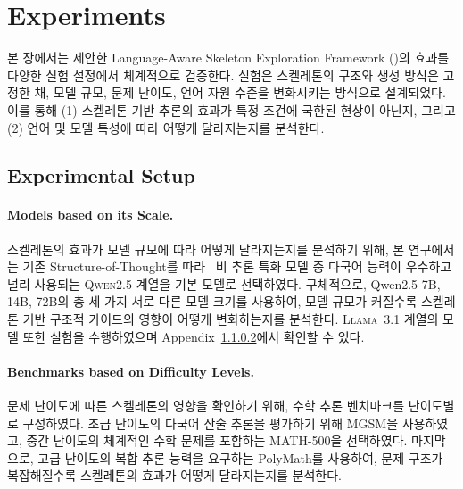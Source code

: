 \section{Experiments}

본 장에서는 제안한 Language-Aware Skeleton Exploration Framework (\LASEF)의 효과를 다양한 실험 설정에서 체계적으로 검증한다. 실험은 스켈레톤의 구조와 생성 방식은 고정한 채, 모델 규모, 문제 난이도, 언어 자원 수준을 변화시키는 방식으로 설계되었다. 이를 통해 (1) 스켈레톤 기반 추론의 효과가 특정 조건에 국한된 현상이 아닌지, 그리고 (2) 언어 및 모델 특성에 따라 어떻게 달라지는지를 분석한다. %

\subsection{Experimental Setup}

\paragraph{Models based on its Scale.}
스켈레톤의 효과가 모델 규모에 따라 어떻게 달라지는지를 분석하기 위해, 본 연구에서는 기존 Structure-of-Thought를 따라~\citep{qi2025sot} 비 추론 특화 모델 중 다국어 능력이 우수하고 널리 사용되는 \textsc{Qwen2.5} 계열을 기본 모델로 선택하였다. 구체적으로, Qwen2.5-7B, 14B, 72B의 총 세 가지 서로 다른 모델 크기를 사용하여, 모델 규모가 커질수록 스켈레톤 기반 구조적 가이드의 영향이 어떻게 변화하는지를 분석한다. \textsc{Llama~3.1} 계열의 모델 또한 실험을 수행하였으며 Appendix~\ref{}에서 확인할 수 있다.


\paragraph{Benchmarks based on Difficulty Levels.}
문제 난이도에 따른 스켈레톤의 영향을 확인하기 위해, 수학 추론 벤치마크를 난이도별로 구성하였다. 초급 난이도의 다국어 산술 추론을 평가하기 위해 MGSM을 사용하였고, 중간 난이도의 체계적인 수학 문제를 포함하는 MATH-500을 선택하였다. 마지막으로, 고급 난이도의 복합 추론 능력을 요구하는 PolyMath를 사용하여, 문제 구조가 복잡해질수록 스켈레톤의 효과가 어떻게 달라지는지를 분석한다.

